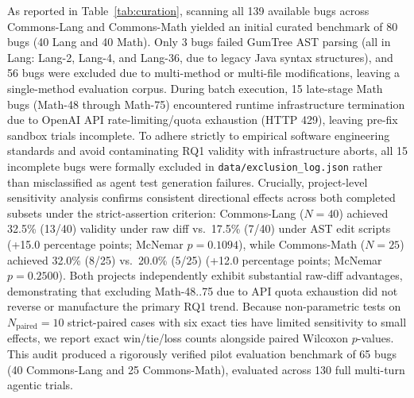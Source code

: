 \documentclass[12pt, a4paper]{article}
\begin{document}
As reported in Table~\ref{tab:curation}, scanning all 139 available bugs across Commons-Lang and Commons-Math yielded an initial curated benchmark of 80 bugs (40 Lang and 40 Math).
Only 3 bugs failed GumTree AST parsing (all in Lang: Lang-2, Lang-4, and Lang-36, due to legacy Java syntax structures), and 56 bugs were excluded due to multi-method or multi-file modifications, leaving a single-method evaluation corpus.
During batch execution, 15 late-stage Math bugs (Math-48 through Math-75) encountered runtime infrastructure termination due to OpenAI API rate-limiting/quota exhaustion (HTTP 429), leaving pre-fix sandbox trials incomplete.
To adhere strictly to empirical software engineering standards and avoid contaminating RQ1 validity with infrastructure aborts, all 15 incomplete bugs were formally excluded in \texttt{data/exclusion\_log.json} rather than misclassified as agent test generation failures.
Crucially, project-level sensitivity analysis confirms consistent directional effects across both completed subsets under the strict-assertion criterion: Commons-Lang ($N=40$) achieved 32.5\% (13/40) validity under raw diff vs.\ 17.5\% (7/40) under AST edit scripts (+15.0 percentage points; McNemar $p = 0.1094$), while Commons-Math ($N=25$) achieved 32.0\% (8/25) vs.\ 20.0\% (5/25) (+12.0 percentage points; McNemar $p = 0.2500$).
Both projects independently exhibit substantial raw-diff advantages, demonstrating that excluding Math-48..75 due to API quota exhaustion did not reverse or manufacture the primary RQ1 trend.
Because non-parametric tests on $N_{\text{paired}}=10$ strict-paired cases with six exact ties have limited sensitivity to small effects, we report exact win/tie/loss counts alongside paired Wilcoxon $p$-values.
This audit produced a rigorously verified pilot evaluation benchmark of 65 bugs (40 Commons-Lang and 25 Commons-Math), evaluated across 130 full multi-turn agentic trials.
\end{document}
